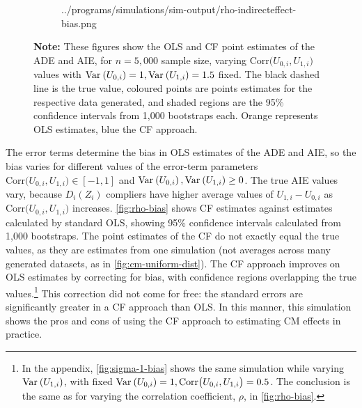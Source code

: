 \begin{figure}[h!]
\begin{subfigure}[c]{0.475\textwidth}
{            ../programs/simulations/sim-output/rho-indirecteffect-bias.png}
    \end{subfigure}
    \label{fig:rho-bias}
    \justify
    \footnotesize    
    \textbf{Note:}
    These figures show the OLS and CF point estimates of the ADE and AIE, for $n = 5,000$ sample size, varying $\text{Corr}\big(U_{0,i}, U_{1,i}\big)$ values with $\text{Var}_{} \left( U_{0,i} \right) = 1, \text{Var}_{} \left( U_{1,i} \right) = 1.5$ fixed.
    The black dashed line is the true value, coloured points are points estimates for the respective data generated, and shaded regions are the 95\% confidence intervals from 1,000 bootstraps each.
    Orange represents OLS estimates, blue the CF approach.
\end{figure}

The error terms determine the bias in OLS estimates of the ADE and AIE, so the bias varies for different values of the error-term parameters $\text{Corr}\big(U_{0,i}, U_{1,i}\big) \in [-1, 1]$ and $\text{Var}_{} \left( U_{0,i} \right), \text{Var}_{} \left( U_{1,i} \right) \geq 0$.
The true AIE values vary, because $D_i(Z_i)$ compliers have higher average values of $U_{1,i} - U_{0,i}$ as $\text{Corr}\big(U_{0,i}, U_{1,i}\big)$ increases.
\autoref{fig:rho-bias} shows CF estimates against estimates calculated by standard OLS, showing 95\% confidence intervals calculated from 1,000 bootstraps.
The point estimates of the CF do not exactly equal the true values, as they are estimates from one simulation (not averages across many generated datasets, as in \autoref{fig:cm-uniform-dist}).
The CF approach improves on OLS estimates by correcting for bias, with confidence regions overlapping the true values.\footnote{
    In the appendix, \autoref{fig:sigma-1-bias} shows the same simulation while varying $\text{Var}_{} \left( U_{1,i} \right)$, with fixed $\text{Var}_{} \left( U_{0,i} \right) = 1, \text{Corr}\big(U_{0,i}, U_{1,i}\big) = 0.5$.
    The conclusion is the same as for varying the correlation coefficient, $\rho$, in \autoref{fig:rho-bias}.
}
This correction did not come for free: the standard errors are significantly greater in a CF approach than OLS.
In this manner, this simulation shows the pros and cons of using the CF approach to estimating CM effects in practice.
